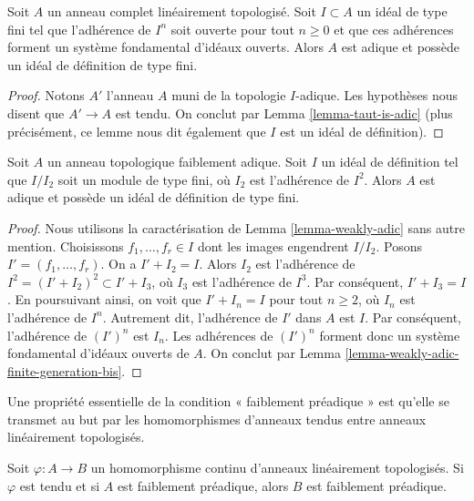 \begin{lemma}
\label{lemma-weakly-adic-finite-generation-bis}
Soit $A$ un anneau complet linéairement topologisé. Soit $I \subset A$ un idéal
de type fini tel que l'adhérence de $I^n$ soit ouverte pour tout
$n \geq 0$ et que ces adhérences forment un système fondamental d'idéaux ouverts.
Alors $A$ est adique et possède un idéal de définition de type fini.
\end{lemma}

\begin{proof}
Notons $A'$ l'anneau $A$ muni de la topologie $I$-adique.
Les hypothèses nous disent que $A' \to A$ est tendu.
On conclut par Lemma \ref{lemma-taut-is-adic} (plus précisément, ce
lemme nous dit également que $I$ est un idéal de définition).
\end{proof}

\begin{lemma}
\label{lemma-weakly-adic-finite-generation}
Soit $A$ un anneau topologique faiblement adique. Soit $I$ un
idéal de définition tel que $I/I_2$ soit un module de type fini,
où $I_2$ est l'adhérence de $I^2$.
Alors $A$ est adique et possède un idéal de définition de type fini.
\end{lemma}

\begin{proof}
Nous utilisons la caractérisation de Lemma \ref{lemma-weakly-adic}
sans autre mention.
Choisissons $f_1, \ldots, f_r \in I$ dont les images engendrent $I/I_2$.
Posons $I' = (f_1, \ldots, f_r)$. On a $I' + I_2 = I$.
Alors $I_2$ est l'adhérence de $I^2 = (I' + I_2)^2 \subset I' + I_3$,
où $I_3$ est l'adhérence de $I^3$. Par conséquent, $I' + I_3 = I$.
En poursuivant ainsi, on voit que $I' + I_n = I$ pour tout $n \geq 2$,
où $I_n$ est l'adhérence de $I^n$.
Autrement dit, l'adhérence de $I'$ dans $A$ est $I$.
Par conséquent, l'adhérence de $(I')^n$ est $I_n$. Les adhérences de $(I')^n$
forment donc un système fondamental d'idéaux ouverts de $A$.
On conclut par Lemma \ref{lemma-weakly-adic-finite-generation-bis}.
\end{proof}

\noindent
Une propriété essentielle de la condition « faiblement préadique » est qu'elle se transmet au but
par les homomorphismes d'anneaux tendus entre anneaux linéairement topologisés.

\begin{lemma}
\label{lemma-taut-ascent-weakly-adic}
Soit $\varphi : A \to B$ un homomorphisme continu d'anneaux
linéairement topologisés. Si $\varphi$ est tendu et si $A$
est faiblement préadique, alors $B$ est faiblement préadique.
\end{lemma}

